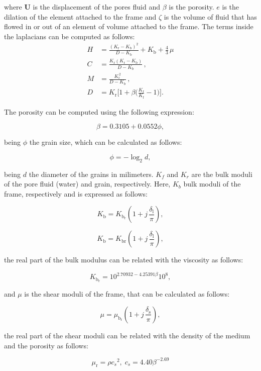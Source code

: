 \documentclass{article}[a4paper, 12pt]
\begin{document}
 where $\bm{U}$ is the displacement of the pores fluid and $\beta$ is the porosity. $e$ is the dilation of the element attached to the frame and $\zeta$ is the volume of fluid that has flowed in or out of an element of volume attached to the frame. The terms inside the laplacians can be computed as follows:
$$
\begin{aligned} {H} & {{}=\frac{( K_{\mathrm{r}}-K_{\mathrm{b}} )^{2}} {D-K_{\mathrm{b}}}+K_{\mathrm{b}}+\frac{4} {3} \, \mu} \\[1.5ex]
{C} & {{}=\frac{K_{\mathrm{r}} ( K_{\mathrm{r}}-K_{\mathrm{b}} )} {D-K_{\mathrm{b}}} \,,} \\[1.5ex]
{M} & {{}=\frac{K_{\mathrm{r}}^{\, 2}} {D-K_{\mathrm{b}}} \,,} \\[1.5ex] 
D&=K_{\mathrm{r}} \bigg[ 1+\beta\bigg( \frac{K_{\mathrm{r}}} {K_{\mathrm{f}}}-1 \bigg) \bigg].
\end{aligned}
$$

The porosity can be computed using the following expression:

$$ \beta = 0.3105 + 0.0552\phi, $$

being $\phi$ the grain size, which can be calculated as follows:

$$ \phi=-\operatorname{l o g}_{2}d,$$

being $d$ the diameter of the grains in milimeters. $K_f$ and $K_r$ are the bulk moduli of the pore fluid (water) and grain, respectively. Here, $K_b$  bulk moduli of the frame, respectively and is expressed as follows:

$$ 
K_{\mathrm{b}}=K_{\mathrm{b_r}} \! \left( 1+j \, \frac{\delta_{\mathrm{l}}} {\pi} \right),
$$


$$ K_{\mathrm{b}}=K_{\mathrm{b r}} \! \left( 1+j \, \frac{\delta_{\mathrm{l}}} {\pi} \right),
$$

the real part of the bulk modulus can be related with the viscosity as follows:


$$ K_\mathrm{b_r} = 10^{2.70932-4.25391\beta} 10^8,$$

and $\mu$ is the shear moduli of the frame, that can be calculated as follows:

$$ \mu=\mu_{\mathrm{b_r}} \! \left( 1+j \, \frac{\delta_{\mathrm{s}}} {\pi} \right),
$$

the real part of the shear moduli can be related with the density of the medium and the porosity as follows:

$$ \mu_{\mathrm{r}}=\rho{c_{s}}^{2}, \; c_{s}=4. 4 0 \beta^{-2.69}
$$
\end{document}
